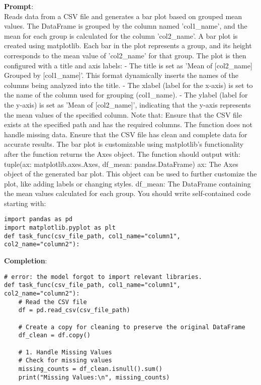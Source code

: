 \onecolumn
\begin{tcolorbox}[colback=blue!5!white, colframe=blue!75!black, title=Failed Example \#4 Generated by o1-mini, text width=\textwidth]
\textbf{Prompt}:\\
Reads data from a CSV file and generates a bar plot based on grouped mean values. The DataFrame is grouped by the column named 'col1\_name', and the mean for each group is calculated for the column 'col2\_name'. A bar plot is created using matplotlib. Each bar in the plot represents a group, and its height corresponds to the mean value of 'col2\_name' for that group. The plot is then configured with a title and axis labels: - The title is set as 'Mean of [col2\_name] Grouped by [col1\_name]'. This format dynamically inserts the names of the columns being analyzed into the title. - The xlabel (label for the x-axis) is set to the name of the column used for grouping (col1\_name). - The ylabel (label for the y-axis) is set as 'Mean of [col2\_name]', indicating that the y-axis represents the mean values of the specified column. Note that: Ensure that the CSV file exists at the specified path and has the required columns. The function does not handle missing data. Ensure that the CSV file has clean and complete data for accurate results. The bar plot is customizable using matplotlib's functionality after the function returns the Axes object. The function should output with: tuple(ax: matplotlib.axes.Axes, df\_mean: pandas.DataFrame) ax: The Axes object of the generated bar plot. This object can be used to further customize the plot, like adding labels or changing styles. df\_mean: The DataFrame containing the mean values calculated for each group. You should write self-contained code starting with:
\begin{verbatim}
import pandas as pd 
import matplotlib.pyplot as plt 
def task_func(csv_file_path, col1_name="column1", col2_name="column2"):
\end{verbatim}
\small
\textbf{Completion}:\\
\begin{verbatim}
# error: the model forgot to import relevant libraries.
def task_func(csv_file_path, col1_name="column1", col2_name="column2"):
    # Read the CSV file
    df = pd.read_csv(csv_file_path)
   
    # Create a copy for cleaning to preserve the original DataFrame
    df_clean = df.copy()
   
    # 1. Handle Missing Values
    # Check for missing values
    missing_counts = df_clean.isnull().sum()
    print("Missing Values:\n", missing_counts)
   

\end{verbatim}
\end{tcolorbox}
